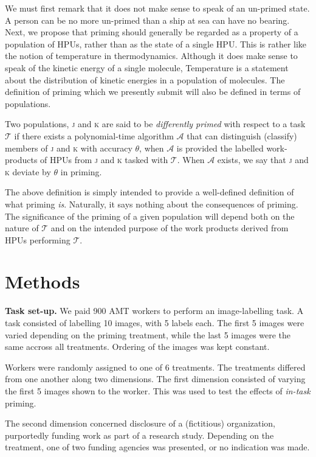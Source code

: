 \documentclass[letterpaper, 11pt, twocolumn]{article}
\begin{document}
We must first remark that it does not make sense to speak of an un-primed 
state.  A person can be no more un-primed than a ship at sea can have no 
bearing.  Next, we propose that priming should generally be regarded as a
property of a population of HPUs, rather than as the state of a single HPU.
This is rather like the notion of temperature in thermodynamics.  Although
it does make sense to speak of the kinetic energy of a single molecule, 
Temperature is a statement about the distribution of kinetic energies in a
population of molecules.  The definition of priming which we presently submit
will also be defined in terms of populations.

Two populations, \textsc{j} and \textsc{k} are said to be 
\textit{differently primed} with respect to a task $\mathcal{T}$ if there 
exists a polynomial-time algorithm $\mathcal{A}$ that can distinguish 
(classify) members of \textsc{j} and \textsc{k} with accuracy $\theta$, when 
$\mathcal{A}$ is provided the labelled work-products of HPUs from \textsc{j} 
and \textsc{k} tasked with $\mathcal{T}$.
When $\mathcal{A}$ exists, we say that \textsc{j} and \textsc{k} deviate by 
$\theta$ in priming.

The above definition is simply intended to provide a well-defined definition
of what priming \textit{is}.  Naturally, it says nothing about the consequences
of priming.  The significance of the priming of a given population will
depend both on the nature of $\mathcal{T}$ and on the intended purpose of 
the work products derived from HPUs performing $\mathcal{T}$.


\section*{Methods}

\textbf{Task set-up.}
We paid 900 AMT workers to perform an image-labelling task.  A task consisted 
of labelling 10 images, with 5 labels each.  The first 5 images were varied 
depending on the priming treatment, while the last 5 images were the same 
accross all treatments.  Ordering of the images was kept constant.

Workers were randomly assigned to one of 6 treatments.  The treatments differed
from one another along two dimensions. The first dimension consisted of 
varying the first 5 images shown to the worker.  This was used to test the
effects of \textit{in-task} priming.

The second dimension concerned disclosure of a (fictitious) organization,
purportedly funding work as part of a research study.  Depending on the 
treatment, one of two funding agencies was presented, or no indication was 
made.
\end{document}
